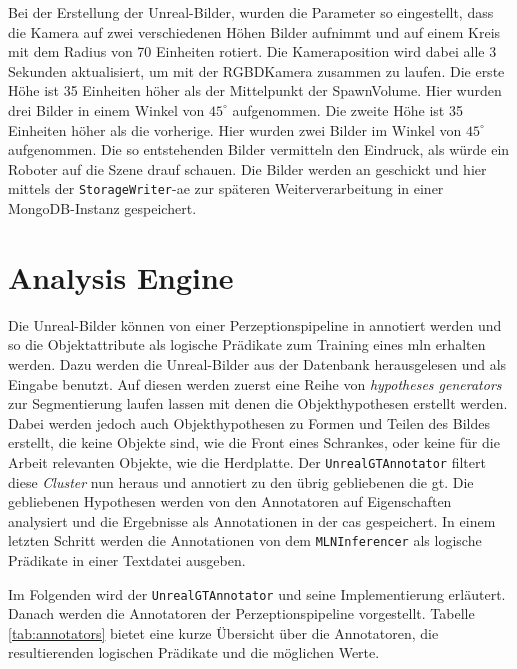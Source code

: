 Bei der Erstellung der Unreal-Bilder, wurden die Parameter so eingestellt, dass die Kamera auf zwei verschiedenen Höhen Bilder aufnimmt und auf einem Kreis mit dem Radius von 70 Einheiten rotiert. Die Kameraposition wird dabei alle 3 Sekunden aktualisiert, um mit der RGBDKamera zusammen zu laufen. Die erste Höhe ist 35 Einheiten höher als der Mittelpunkt der SpawnVolume. Hier wurden drei Bilder in einem Winkel von $45^\circ$ aufgenommen. Die zweite Höhe ist 35 Einheiten höher als die vorherige. Hier wurden zwei Bilder im Winkel von $45^\circ$ aufgenommen. Die so entstehenden Bilder vermitteln den Eindruck, als würde ein Roboter auf die Szene drauf schauen. Die Bilder werden an \robosherlock geschickt und hier mittels der \texttt{StorageWriter}-\gls{ae} zur späteren Weiterverarbeitung in einer MongoDB-Instanz gespeichert.

\section{Analysis Engine}
\label{sec:analysisengine}
Die Unreal-Bilder können  von einer Perzeptionspipeline in \robosherlock annotiert werden und so die Objektattribute als logische Prädikate zum Training eines \gls{mln} erhalten werden. Dazu werden die Unreal-Bilder aus der Datenbank herausgelesen und als Eingabe benutzt. Auf diesen werden zuerst eine Reihe von \textit{hypotheses generators} zur Segmentierung laufen lassen mit denen die Objekthypothesen erstellt werden. Dabei werden jedoch auch Objekthypothesen zu Formen und Teilen des Bildes erstellt, die keine Objekte sind, wie die Front eines Schrankes, oder keine für die Arbeit relevanten Objekte, wie die Herdplatte. Der \texttt{UnrealGTAnnotator} filtert diese \textit{Cluster} nun heraus und annotiert zu den übrig gebliebenen die \gls{gt}. Die gebliebenen Hypothesen werden von den Annotatoren auf Eigenschaften analysiert und die Ergebnisse als Annotationen in der \gls{cas} gespeichert. In einem letzten Schritt werden die Annotationen von dem \texttt{MLNInferencer} als logische Prädikate in einer Textdatei ausgeben. \par 

Im Folgenden wird der \texttt{UnrealGTAnnotator} und seine Implementierung erläutert. Danach werden die Annotatoren der Perzeptionspipeline vorgestellt. Tabelle \ref{tab:annotators} bietet eine kurze Übersicht über die Annotatoren, die resultierenden logischen Prädikate und die möglichen Werte.

